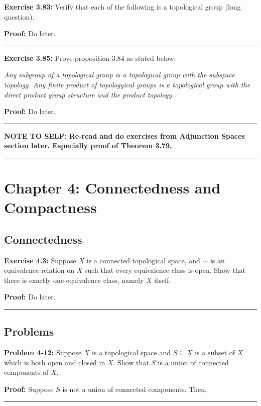 \documentclass{article}
\begin{document}
\textbf{Exercise 3.83:} Verify that each of the following is a topological group (long question).

\vskip 0.5cm

\textbf{Proof:} Do later.

\vskip 0.5cm
\hrule
\vskip 0.5cm

\textbf{Exercise 3.85:} Prove proposition 3.84 as stated below:

\emph{Any subgroup of a topological group is a topological group with the subspace topology. Any finite product of topologyical groups is a topological group with the direct product group structure and the product topology.}

\vskip 0.5cm

\textbf{Proof:} Do later.

\vskip 0.5cm
\hrule
\vskip 0.5cm

\textbf{NOTE TO SELF: Re-read and do exercises from Adjunction Spaces section later. Especially proof of Theorem 3.79.}

\vskip 0.5cm
\hrule
\vskip 0.5cm

\section{Chapter 4: Connectedness and Compactness}

\subsection{Connectedness}

\textbf{Exercise 4.3:} Suppose $X$ is a connected topological space, and $\sim$ is an equivalence relation on $X$ such that every equivalence class is open. Show that there is exactly one
equivalence class, namely $X$ itself.

\vskip 0.5cm

\textbf{Proof:} Do later.

\vskip 0.5cm
\hrule
\vskip 0.5cm

\subsection{Problems}

\textbf{Problem 4-12:} Suppose $X$ is a topological space and $S \subseteq X$ is a subset of $X$ which is both open and closed in $X$. Show that $S$ is a union of connected components of $X$.
\vskip 0.5cm

\textbf{Proof:} Suppose $S$ is not a union of connected components. Then, 

\vskip 0.5cm
\hrule
\vskip 0.5cm
\end{document}
